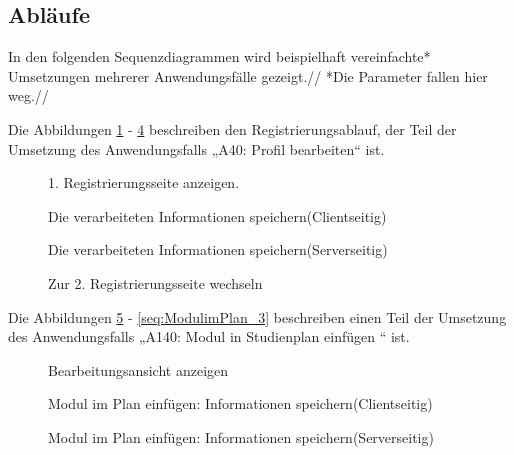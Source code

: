 \subsection{Abläufe}

In den folgenden Sequenzdiagrammen wird beispielhaft vereinfachte* Umsetzungen mehrerer Anwendungsfälle gezeigt.//
*Die Parameter fallen hier weg.//

Die Abbildungen \ref{seq:Registrierung_1} - \ref{seq:Registrierung_4} beschreiben den Registrierungsablauf, der Teil der Umsetzung des Anwendungsfalls „A40: Proﬁl bearbeiten“ ist.

\begin{figure}[H]
	
	\caption{1. Registrierungsseite anzeigen.}
	\label{seq:Registrierung_1}
\end{figure}

\begin{figure}[H]
	
	\caption{Die verarbeiteten Informationen speichern(Clientseitig)}
	\label{seq:Registrierung_2}
\end{figure}

\begin{figure}[H]
	
	\caption{Die verarbeiteten Informationen speichern(Serverseitig)}
	\label{seq:Registrierung_3}
\end{figure}

\begin{figure}[H]
	
	\caption{Zur 2. Registrierungsseite wechseln}
	\label{seq:Registrierung_4}
\end{figure}

Die Abbildungen \ref{seq:addmodul_1} - \ref{seq:ModulimPlan_3} beschreiben einen Teil der Umsetzung des Anwendungsfalls „A140: Modul in Studienplan einfügen “ ist.

\begin{figure}[H]
	
	\caption{Bearbeitungsansicht anzeigen}
	\label{seq:addmodul_1}
\end{figure}

\begin{figure}[H]
	
	\caption{Modul im Plan einfügen: Informationen speichern(Clientseitig)}
	\label{seq:addmodul_2}
\end{figure}

\begin{figure}[H]
	
	\caption{Modul im Plan einfügen: Informationen speichern(Serverseitig)}
	\label{seq:addmodul_3}
\end{figure}


